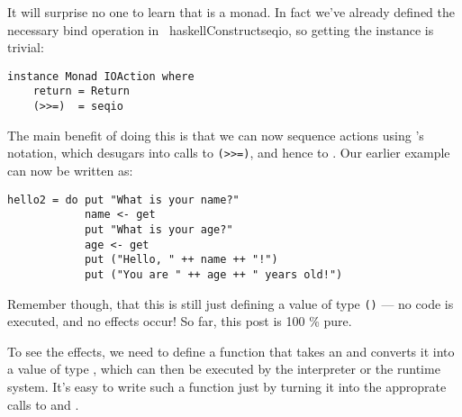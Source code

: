 \documentclass[thesis-solanki.tex]{subfiles}
\begin{document}
It will surprise no one to learn that  is a monad. In fact we've already defined the necessary bind operation in \
haskellConstruct{seqio}, so getting 
the  instance is trivial:

\begin{code-list}[H]
\begin{singlespace}
\begin{verbatim}
instance Monad IOAction where
    return = Return
    (>>=)  = seqio
\end{verbatim}

\end{singlespace}
\caption{}
\label{}
\end{code-list}



The main benefit of doing this is that we can now sequence actions using 's
 notation, which desugars into calls to \Verb!(>>=)!, and 
hence to \haskellConstruct{seqio}. Our earlier \haskellConstruct{hello} example can now be written as:
\par

\begin{code-list}[H]
\begin{singlespace}
\begin{verbatim}
hello2 = do put "What is your name?"
            name <- get
            put "What is your age?"
            age <- get
            put ("Hello, " ++ name ++ "!")
            put ("You are " ++ age ++ " years old!")
\end{verbatim}
\end{singlespace}
\caption{}
\label{}
\end{code-list}


Remember though, that this is still just defining a value of type 
\haskellConstruct{IOAction} \Verb!()! ---
no code is executed, and no effects occur! So far, this post is 100 \% pure.

To see the effects, we need to define a function that takes an   and converts it into a value of type  , which can then be executed by the interpreter or the runtime system. It's easy to write such a function just by turning it into the approprate calls to  and .
\end{document}
